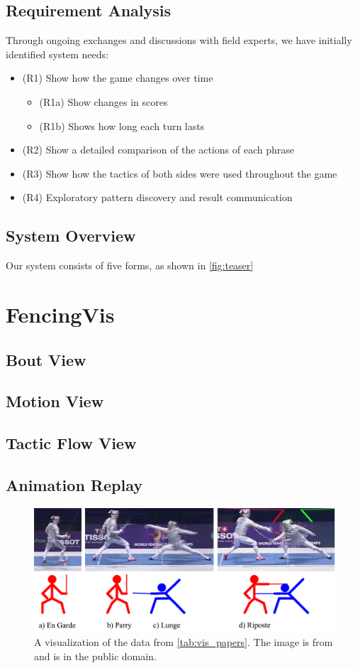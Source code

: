 \documentclass[journal]{vgtc}                %
\begin{document}
\subsection{Requirement Analysis}
Through ongoing exchanges and discussions with field experts, we have initially identified system needs:
\begin{itemize}
	\item (R1) Show how the game changes over time
	\begin{itemize}
		\item (R1a) Show changes in scores
		\item (R1b) Shows how long each turn lasts
	\end{itemize}
	\item (R2) Show a detailed comparison of the actions of each phrase
	\item (R3) Show how the tactics of both sides were used throughout the game
	\item (R4) Exploratory pattern discovery and result communication
\end{itemize}
\subsection{System Overview}
Our system consists of five forms, as shown in \autoref{fig:teaser}
\section{FencingVis}
\subsection{Bout View}

\subsection{Motion View}
\subsection{Tactic Flow View}
\subsection{Animation Replay}
\begin{figure}[tb]
	\centering
	\includegraphics[width=\columnwidth]{glyph}
	\caption{A visualization of the data from \autoref{tab:vis_papers}. The image is from \cite{Isenberg:2017:VMC} and is in the public domain.}
	\label{fig:sample}
\end{figure}
\end{document}
